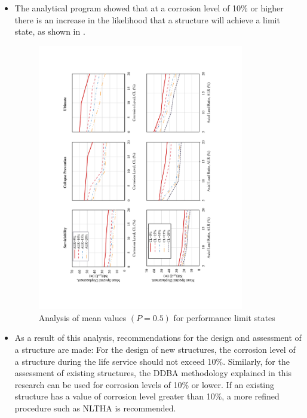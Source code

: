 \begin{itemize}
    \item The analytical program showed that at a corrosion level of 10\% or higher there is an increase in the likelihood that a structure will achieve a limit state, as shown in .
    
    \begin{figure}[htbp]
	\centering
	\includegraphics[width=0.85\textwidth]{VAC Thesis 2.0/Chapter-5/figs/Analysis_of_Mean_SDs.pdf}
	\caption{Analysis of mean values $(P=0.5)$ for performance limit states}
	\label{fig:mean_prob_vs_CL_ch7}
    \end{figure}
    
    \item As a result of this analysis, recommendations for the design and assessment of a structure are made: For the design of new structures, the corrosion level of a structure during the life service should not exceed 10\%. Similarly, for the assessment of existing structures, the DDBA methodology explained in this research can be used for corrosion levels of 10\% or lower. If an existing structure has a value of corrosion level greater than 10\%, a more refined procedure such as NLTHA is recommended.
\end{itemize}

